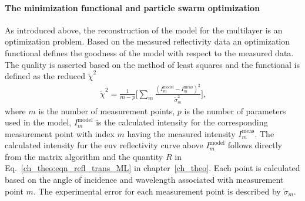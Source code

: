 \paragraph{The minimization functional and particle swarm optimization}
As introduced above, the reconstruction of the model for the multilayer is an optimization problem. Based on the measured reflectivity data an optimization functional defines the goodness of the model with respect to the measured data. The quality is asserted based on the method of least squares \cite{legendre_nouvelles_1805, gauss_theoria_1809, birge_calculation_1932} and the functional is defined as the reduced $\tilde{\chi}^2$
\begin{align}
\tilde{\chi}^2 = \frac{1}{m - p} \bigg[\sum\limits_{m} \frac{(I_m^\text{model} 
- I_m^\text{meas})^2}{\tilde{\sigma}_m^2} \bigg] \text{,} 
\label{ch_spec:eqn_reduced_chi_squared}
\end{align}
where $m$ is the number of measurement points, $p$ is the number of parameters used in the model, $I_m^\text{model}$ is the calculated intensity for the corresponding measurement point with index $m$ having the measured intensity $I_m^\text{meas}$. The calculated intensity fur the \gls{euv} reflectivity curve above $I_m^\text{model}$ follows directly from the matrix algorithm and the quantity $R$ in Eq.~\eqref{ch_theo:eqn_refl_trans_ML} in chapter~\ref{ch_theo}. Each point is calculated based on the angle of incidence and wavelength associated with measurement point $m$. The experimental error for each measurement point is described by $\tilde{\sigma}_m$.


